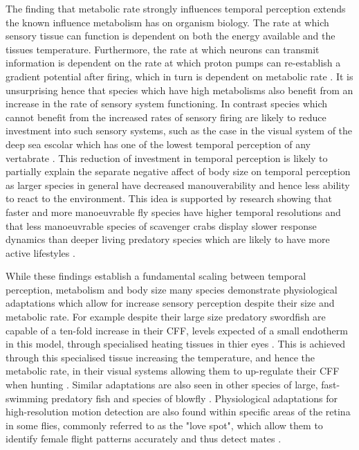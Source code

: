 The finding that metabolic rate strongly influences temporal perception extends the known influence metabolism has on organism biology. The rate at which sensory tissue can function is dependent on both the energy available and the tissues temperature. Furthermore, the rate at which neurons can transmit information is dependent on the rate at which proton pumps can re-establish a gradient potential after firing, which in turn is dependent on metabolic rate \citep{laughlin2001energy}. It is unsurprising hence that species which have high metabolisms also benefit from an increase in the rate of sensory system functioning. In contrast species which cannot benefit from the increased rates of sensory firing are likely to reduce investment into such sensory systems, such as the case in the visual system of the deep sea escolar which has one of the lowest temporal perception of any vertabrate \citep{landgren2014visual}. This reduction of investment in temporal perception is likely to partially explain the separate negative affect of body size on temporal perception as larger species in general have decreased manouverability \citep{heglund1988speed,dudley2002mechanisms,biewener2003animal,sato2007stroke,vogel2008modes,hedrick2011damping,watanabe2012slowest} and hence less ability to react to the environment. This idea is supported by research showing that faster and more manoeuvrable fly species have higher temporal resolutions \citep{laughlin1993fast} and that less manoeuvrable species of scavenger crabs display slower response dynamics than deeper living predatory species which are likely to have more active lifestyles \citep{frank2012light}. 


While these findings establish a fundamental scaling between temporal perception, metabolism and body size many species demonstrate physiological adaptations which allow for increase sensory perception despite their size and metabolic rate. For example despite their large size predatory swordfish are capable of a ten-fold increase in their CFF, levels expected of a small endotherm in this model, through specialised heating tissues in thier eyes \citep{fritsches2005warm}. This is achieved through this specialised tissue increasing the temperature, and hence the metabolic rate, in their visual systems allowing them to up-regulate their CFF when hunting \citep{fritsches2005warm}. Similar adaptations are also seen in other species of large, fast-swimming predatory fish \citep{carey1982brain,block1985warm,Wegner15052015} and species of blowfly \citep{tatler2000temperature}. Physiological adaptations for high-resolution motion detection are also found within specific areas of the retina in some flies, commonly referred to as the "love spot", which allow them to identify female flight patterns accurately and thus detect mates \citep{land1974chasing}. 

